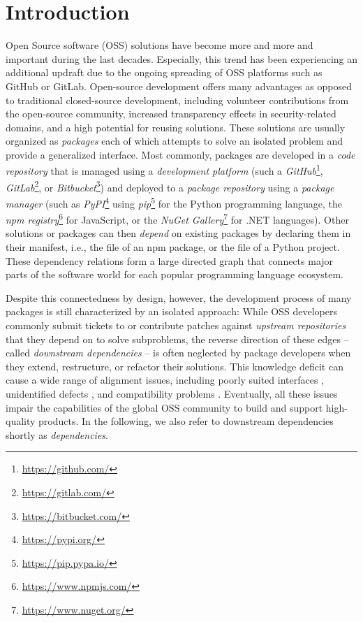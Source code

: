 \section{Introduction}
\label{sec:introduction}

Open Source software (OSS) solutions have become more and more and important during the last decades.
Especially, this trend has been experiencing an additional updraft due to the ongoing spreading of OSS platforms such as GitHub or GitLab.
Open-source development offers many advantages as opposed to traditional closed-source development, including volunteer contributions from the open-source community, increased transparency effects in security-related domains, and a high potential for reusing solutions.
These solutions are usually organized as \emph{packages} each of which attempts to solve an isolated problem and provide a generalized interface.
Most commonly, packages are developed in a \emph{code repository} that is managed using a \emph{development platform} (such a \emph{GitHub}\footnote{\url{https://github.com/}}, \emph{GitLab}\footnote{\url{https://gitlab.com/}}, or \emph{Bitbucket}\footnote{\url{https://bitbucket.com/}}) and deployed to a \emph{package repository} using a \emph{package manager} (such as \emph{PyPI}\footnote{\url{https://pypi.org/}} using \emph{pip}\footnote{\url{https://pip.pypa.io/}} for the Python programming language, the \emph{npm registry}\footnote{\url{https://www.npmjs.com/}} for JavaScript, or the \emph{NuGet Gallery}\footnote{\url{https://www.nuget.org/}} for .NET languages).
Other solutions or packages can then \emph{depend} on existing packages by declaring them in their manifest, i.e., the  file of an npm package, or the  file of a Python project.
These dependency relations form a large directed graph that connects major parts of the software world for each popular programming language ecosystem.

Despite this connectedness by design, however, the development process of many packages is still characterized by an isolated approach:
While OSS developers commonly submit tickets to or contribute patches against \emph{upstream repositories} that they depend on to solve subproblems, the reverse direction of these edges -- called \emph{downstream dependencies} -- is often neglected by package developers when they extend, restructure, or refactor their solutions.
This knowledge deficit can cause a wide range of alignment issues, including poorly suited interfaces \citep{piccioni2013empirical}, unidentified defects \citep{wong2017more}, and compatibility problems \citep{bogart2015breaks}.
Eventually, all these issues impair the capabilities of the global OSS community to build and support high-quality products.
In the following, we also refer to downstream dependencies shortly as \emph{dependencies}.

